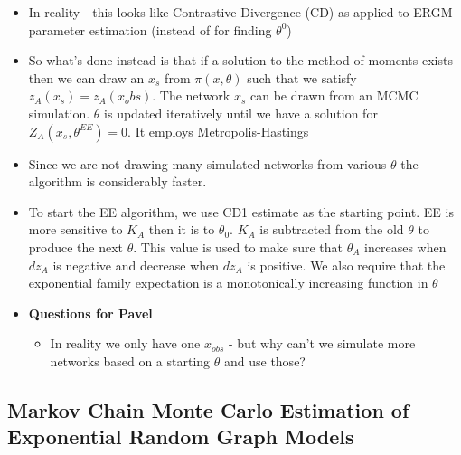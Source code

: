 \begin{itemize}
    \item In reality - this looks like Contrastive Divergence (CD) as applied to ERGM parameter estimation (instead of for finding $\theta^{0}$)
    \item So what's done instead is that if a solution to the method of moments exists then we can draw an $x_s$ from $\pi(x, \theta)$ such that we satisfy $z_{A}(x_s) = z_{A}(x_obs)$. The network $x_s$ can be drawn from an MCMC simulation. $\theta$ is updated iteratively until we have a solution for $Z_{A}(x_s, \theta^{EE}) = 0$. It employs Metropolis-Hastings
    \item Since we are not drawing many simulated networks from various $\theta$ the algorithm is considerably faster.
    \item To start the EE algorithm, we use CD1 estimate as the starting point. EE is more sensitive to $K_A$ then it is to $\theta_0$. $K_A$ is subtracted from the old $\theta$ to produce the next $\theta$. This value is used to make sure that $\theta_A$ increases when $dz_A$ is negative and decrease when $dz_A$ is positive. We also require that the exponential family expectation is a monotonically increasing function in $\theta$
    \item \textbf{Questions for Pavel}
    \begin{itemize}
        \item In reality we only have one $x_{obs}$ - but why can't we simulate more networks based on a starting $\theta$ and use those?
    \end{itemize}
\end{itemize}

\subsection{Markov Chain Monte Carlo Estimation of Exponential Random Graph Models}

